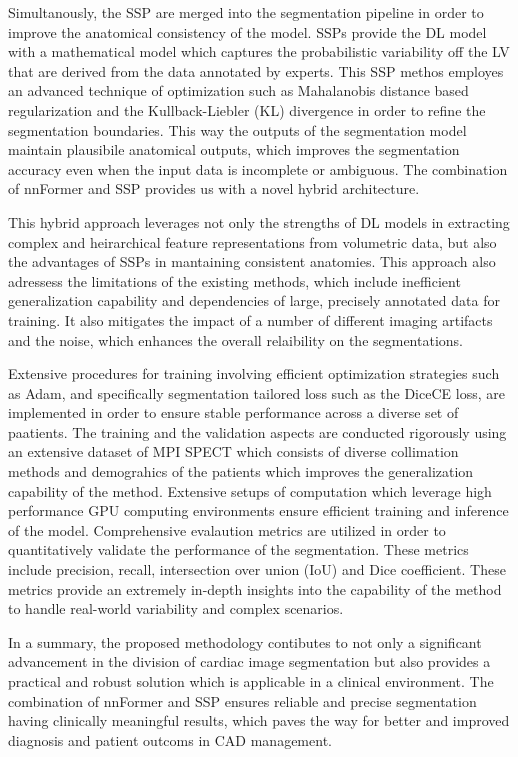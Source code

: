 Simultanously, the SSP are merged into the segmentation pipeline in order to improve the anatomical consistency of the model. SSPs provide the DL model with a mathematical model which captures the probabilistic variability off the LV that are derived from the data annotated by experts. This SSP methos employes an advanced technique of optimization such as Mahalanobis distance based regularization and the Kullback-Liebler (KL) divergence in order to refine the segmentation boundaries. This way the outputs of the segmentation model maintain plausibile anatomical outputs, which improves the segmentation accuracy even when the input data is incomplete or ambiguous. The combination of nnFormer and SSP provides us with a novel hybrid architecture. 

This hybrid approach leverages not only the strengths of DL models in extracting complex and heirarchical feature representations from volumetric data, but also the advantages of SSPs in mantaining consistent anatomies. This approach also adressess the limitations of the existing methods, which include inefficient generalization capability and dependencies of large, precisely annotated data for training. It also mitigates the impact of a number of different imaging artifacts and the noise, which enhances the overall relaibility on the segmentations.

Extensive procedures for training involving efficient optimization strategies such as Adam, and specifically segmentation tailored loss such as the DiceCE loss, are implemented in order to ensure stable performance across a diverse set of paatients. The training and the validation aspects are conducted rigorously using an extensive dataset of MPI SPECT which consists of diverse collimation methods and demograhics of the patients which improves the generalization capability of the method. Extensive setups of computation which leverage high performance GPU computing environments ensure efficient training and inference of the model. Comprehensive evalaution metrics are utilized in order to quantitatively validate the performance of the segmentation. These metrics include precision, recall, intersection over union (IoU) and Dice coefficient. These metrics provide an extremely in-depth insights into the capability of the method to handle real-world variability and complex scenarios.

In a summary, the proposed methodology contibutes to not only a significant advancement in the division of cardiac image segmentation but also provides a practical and robust solution which is applicable in a clinical environment. The combination of nnFormer and SSP ensures reliable and precise segmentation having clinically meaningful results, which paves the way for better and improved diagnosis and patient outcoms in CAD management.


